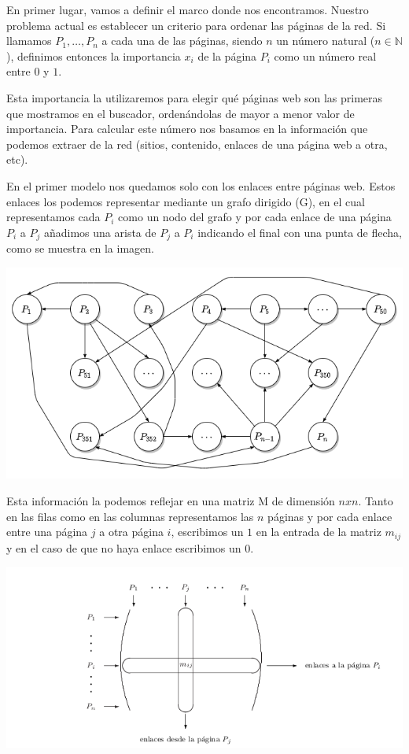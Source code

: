 \documentclass[size=a4, parskip=half, titlepage=false, toc=flat, toc=bib, 12pt]{scrartcl}
\theoremstyle{theorem-style}
\theoremstyle{definition-style}
\theoremstyle{remark-style}
\theoremstyle{example-style}
\theoremstyle{definition-style}
\theoremstyle{remark-style}
\begin{document}
En primer lugar, vamos a definir el marco donde nos encontramos. Nuestro problema actual es establecer un criterio para ordenar las páginas de la red. Si llamamos $P_1, \dots, P_n$ a cada una de las páginas, siendo $n$ un número natural ($n \in \mathbb{N}$), definimos entonces la importancia $x_i$  de la página $P_i$ como un número real entre $0$ y $1$.

Esta importancia la utilizaremos para elegir qué páginas web son las primeras que mostramos en el buscador, ordenándolas de mayor  a menor valor de importancia.
Para calcular este número nos basamos en la información que podemos extraer de la red (sitios, contenido, enlaces de una página web a otra, etc).

En el primer modelo nos quedamos solo con los enlaces entre páginas web. Estos enlaces los podemos representar mediante un grafo dirigido (G), en el cual representamos cada $P_i$ como un nodo del grafo y por cada enlace de una página $P_i$ a $P_j$ añadimos una arista de $P_j$ a $P_i$ indicando el final con una punta de flecha, como se muestra en la imagen.

\includegraphics[width=1.0\textwidth]{./img/grafogrande}

Esta información la podemos reflejar en una matriz M de dimensión $nxn$. Tanto en las filas como en las columnas representamos las $n$ páginas y por cada enlace entre una página $j$ a otra página $i$, escribimos un $1$ en la entrada de la
matriz $m_{ij}$ y en el caso de que no haya enlace escribimos un $0$.

\includegraphics[width=1.0\textwidth]{./img/matriz}
\end{document}
